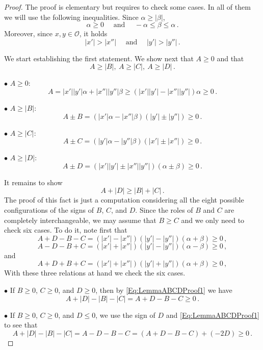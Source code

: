 \documentclass[12pt,reqno]{amsart}
\theoremstyle{definition}
\theoremstyle{remark}
\newcommand{\ocal}{\mathcal{O}}
\numberwithin{equation}{section}
\begin{document}
	\begin{proof} The proof is elementary but requires to check some cases. In all of them we will use the following inequalities. Since $\alpha \geq |\beta |$,
		$$
		\alpha\geq 0 \quad \textrm{ and } \quad  -\alpha \leq \beta \leq \alpha\,.
		$$
		Moreover, since $x,y\in\ocal$, it holds
		$$
		|x'|>|x''| \quad \textrm{ and } \quad |y'|>|y''|\,.
		$$
		
		
		We start establishing the first statement. We show next that $A\geq 0$ and that
		$$
		A \geq |B|, \ A \geq |C| ,\ A \geq |D|\,.
		$$
		
		
		$\bullet$ $A \geq 0$:
		$$
		A =  |x'||y'|  \alpha + |x''||y''|\beta \geq (|x'||y'|  - |x''||y''|)\alpha \geq 0\,.
		$$
		
		$\bullet$ $A \geq |B|$:
		$$
		A\pm B = (|x'|\alpha-|x''|\beta)(|y'|\pm |y''|) \geq 0\,.
		$$
		
		$\bullet$ $A \geq |C|$:
		$$
		A\pm C = (|y'|\alpha-|y''|\beta)(|x'|\pm |x''|)  \geq 0\,.
		$$
		
		$\bullet$ $A \geq |D|$:
		$$
		A\pm D = (|x'||y'| \pm |x''||y''|)(\alpha \pm \beta) \geq 0\,.
		$$
		
		
		It remains to show
		$$
		A + |D| \geq |B| + |C|\,.
		$$
		The proof of this fact is just a computation considering all the eight possible configurations of the signs of $B$, $C$, and $D$. Since the roles of $B$ and $C$ are completely interchangeable, we may assume that $B \geq C$ and we only need to check six cases. To do it, note first that
		\begin{equation}
		\label{Eq:LemmaABCDProof1}
		A + D - B - C = (|x'|-|x''|)(|y'|-|y''|)(\alpha + \beta) \geq 0 \,,
		\end{equation}
		\begin{equation}
		\label{Eq:LemmaABCDProof2}
		A - D - B + C = (|x'|+|x''|)(|y'|-|y''|)(\alpha - \beta) \geq 0 \,,
		\end{equation}
		and
		\begin{equation}
		\label{Eq:LemmaABCDProof3}
		A + D + B + C = (|x'|+|x''|)(|y'|+|y''|)(\alpha + \beta) \geq 0 \,,
		\end{equation}
		With these three relations at hand we check the six cases.
		
		$\bullet$ If $B \geq 0$, $C \geq 0$, and $D \geq 0$, then by \eqref{Eq:LemmaABCDProof1} we have
		$$
		A + |D| - |B| - |C| = A + D - B - C \geq 0\,.
		$$
		
		$\bullet$ If $B \geq 0$, $C \geq 0$, and $D \leq 0$, we use the sign of $D$ and \eqref{Eq:LemmaABCDProof1} to see that
		$$
		A + |D| - |B| - |C| = A - D - B - C =  (A + D - B - C) + (-2D) \geq 0\,.
		$$
		

\end{proof}
\end{document}
